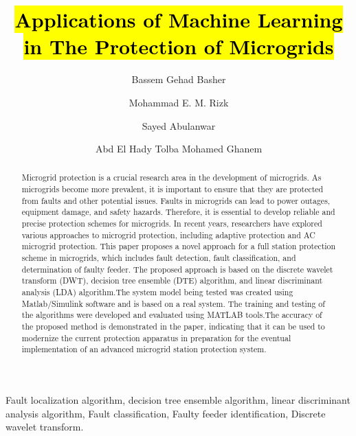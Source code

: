 \documentclass[8pt,a4paper,oneside]{elsarticle}
\begin{document}
\title{\hl{Applications of Machine Learning in The Protection of Microgrids}}

\author[1]{Bassem Gehad Basher}
\author[1]{Mohammad E. M. Rizk}
\author[1,2]{Sayed Abulanwar}
\author[1,3]{Abd El Hady Tolba Mohamed Ghanem}
\ead{}
\address[1]{Electrical Engineering Department, Faculty of Engineering, Mansoura University, 35516, Mansoura, Egypt}

\address[2]{Horus University-Egypt}
\address[3]{Electrical Engineering Department, Faculty of Engineering, Mansoura University}
\begin{abstract}
Microgrid protection is a crucial research area in the development of microgrids. As microgrids become more prevalent, it is important to ensure that they are protected from faults and other potential issues. Faults in microgrids can lead to power outages, equipment damage, and safety hazards. Therefore, it is essential to develop reliable and precise protection schemes for microgrids. In recent years, researchers have explored various approaches to microgrid protection, including adaptive protection and AC microgrid protection. This paper proposes a novel approach for a full station protection scheme in microgrids, which includes fault detection, fault classification, and determination of faulty feeder. The proposed approach is based on the discrete wavelet transform (DWT),  decision tree ensemble (DTE) algorithm, and linear discriminant analysis (LDA) algorithm.The system model being tested was created using Matlab/Simulink software and is based on a real system. The training and testing of the algorithms were developed and evaluated using MATLAB tools.The accuracy of the proposed method is demonstrated in the paper, indicating that it can be used to modernize the current protection apparatus in preparation for the eventual implementation of an advanced microgrid station protection system.

 

\end{abstract}

\begin{keyword}
Fault localization algorithm, decision tree ensemble algorithm, linear discriminant analysis algorithm, Fault classification, Faulty feeder identification, Discrete wavelet transform.
\end{keyword}
\end{document}
